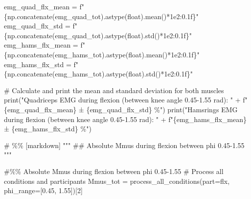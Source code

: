 \documentclass[
  11pt,
  a4paper]{article}
\newenvironment{Shaded}{\begin{snugshade}}{\end{snugshade}}
\newcommand{\BuiltInTok}[1]{\textcolor[rgb]{0.00,0.23,0.31}{#1}}
\newcommand{\CommentTok}[1]{\textcolor[rgb]{0.37,0.37,0.37}{#1}}
\newcommand{\DecValTok}[1]{\textcolor[rgb]{0.68,0.00,0.00}{#1}}
\newcommand{\FloatTok}[1]{\textcolor[rgb]{0.68,0.00,0.00}{#1}}
\newcommand{\NormalTok}[1]{\textcolor[rgb]{0.00,0.23,0.31}{#1}}
\newcommand{\OperatorTok}[1]{\textcolor[rgb]{0.37,0.37,0.37}{#1}}
\newcommand{\SpecialCharTok}[1]{\textcolor[rgb]{0.37,0.37,0.37}{#1}}
\newcommand{\SpecialStringTok}[1]{\textcolor[rgb]{0.13,0.47,0.30}{#1}}
\newcommand{\StringTok}[1]{\textcolor[rgb]{0.13,0.47,0.30}{#1}}
\begin{document}
\begin{Shaded}
\begin{Highlighting}[]
\NormalTok{emg\_quad\_flx\_mean }\OperatorTok{=} \SpecialStringTok{f"}\SpecialCharTok{\{}\NormalTok{np}\SpecialCharTok{.}\NormalTok{concatenate(emg\_quad\_tot)}\SpecialCharTok{.}\NormalTok{astype(}\BuiltInTok{float}\NormalTok{)}\SpecialCharTok{.}\NormalTok{mean()}\OperatorTok{*}\FloatTok{1e2}\SpecialCharTok{:0.1f\}}\SpecialStringTok{"}
\NormalTok{emg\_quad\_flx\_std  }\OperatorTok{=} \SpecialStringTok{f"}\SpecialCharTok{\{}\NormalTok{np}\SpecialCharTok{.}\NormalTok{concatenate(emg\_quad\_tot)}\SpecialCharTok{.}\NormalTok{astype(}\BuiltInTok{float}\NormalTok{)}\SpecialCharTok{.}\NormalTok{std()}\OperatorTok{*}\FloatTok{1e2}\SpecialCharTok{:0.1f\}}\SpecialStringTok{"}
\NormalTok{emg\_hams\_flx\_mean }\OperatorTok{=} \SpecialStringTok{f"}\SpecialCharTok{\{}\NormalTok{np}\SpecialCharTok{.}\NormalTok{concatenate(emg\_hams\_tot)}\SpecialCharTok{.}\NormalTok{astype(}\BuiltInTok{float}\NormalTok{)}\SpecialCharTok{.}\NormalTok{mean()}\OperatorTok{*}\FloatTok{1e2}\SpecialCharTok{:0.1f\}}\SpecialStringTok{"}
\NormalTok{emg\_hams\_flx\_std  }\OperatorTok{=} \SpecialStringTok{f"}\SpecialCharTok{\{}\NormalTok{np}\SpecialCharTok{.}\NormalTok{concatenate(emg\_hams\_tot)}\SpecialCharTok{.}\NormalTok{astype(}\BuiltInTok{float}\NormalTok{)}\SpecialCharTok{.}\NormalTok{std()}\OperatorTok{*}\FloatTok{1e2}\SpecialCharTok{:0.1f\}}\SpecialStringTok{"}

\CommentTok{\# Calculate and print the mean and standard deviation for both muscles}
\BuiltInTok{print}\NormalTok{(}\StringTok{"Quadriceps EMG during flexion (between knee angle 0.45{-}1.55 rad): "} \OperatorTok{+}
      \SpecialStringTok{f"}\SpecialCharTok{\{}\NormalTok{emg\_quad\_flx\_mean}\SpecialCharTok{\}}\SpecialStringTok{ ± }\SpecialCharTok{\{}\NormalTok{emg\_quad\_flx\_std}\SpecialCharTok{\}}\SpecialStringTok{ \%"}\NormalTok{)}
\BuiltInTok{print}\NormalTok{(}\StringTok{"Hamsrings EMG during flexion (between knee angle 0.45{-}1.55 rad): "} \OperatorTok{+}
      \SpecialStringTok{f"}\SpecialCharTok{\{}\NormalTok{emg\_hams\_flx\_mean}\SpecialCharTok{\}}\SpecialStringTok{ ± }\SpecialCharTok{\{}\NormalTok{emg\_hams\_flx\_std}\SpecialCharTok{\}}\SpecialStringTok{ \%"}\NormalTok{)}

\CommentTok{\# \%\% [markdown]}
\CommentTok{"""}
\CommentTok{\#\# Absolute Mmus during flexion between phi 0.45{-}1.55}
\CommentTok{"""}

\CommentTok{\#\%\% Absolute Mmus during flexion between phi 0.45{-}1.55}
\CommentTok{\# Process all conditions and participants}
\NormalTok{Mmus\_tot }\OperatorTok{=}\NormalTok{ process\_all\_conditions(part}\OperatorTok{=}\StringTok{\textquotesingle{}flx\textquotesingle{}}\NormalTok{, phi\_range}\OperatorTok{=}\NormalTok{[}\FloatTok{0.45}\NormalTok{, }\FloatTok{1.55}\NormalTok{])[}\DecValTok{2}\NormalTok{]}


\end{Highlighting}
\end{Shaded}
\end{document}
